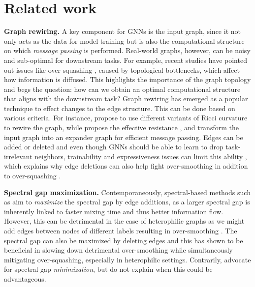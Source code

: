 \section{Related work}
\textbf{Graph rewiring.}
A key component for GNNs is the input graph, since it not only acts as the data for model training but is also the computational structure on which \emph{message passing} \citep{quachem} is performed. Real-world graphs, however, can be noisy and sub-optimal for downstream tasks. For example, recent studies have pointed out issues like over-squashing \citep{alon2021on,topping2022understanding,digiovanni2023oversquashing}, caused by topological bottlenecks, which affect how information is diffused. This highlights the importance of the graph topology and begs the question: how can we obtain an optimal computational structure that aligns with the downstream task? Graph rewiring has emerged as a popular technique to effect changes to the edge structure. This can be done based on various criteria. For instance, \citet{topping2022understanding,sjlr,borf} propose to use different variants of Ricci curvature \citep{hamilton} to rewire the graph, while \citet{effectiveresistance} propose the effective resistance \citep{chandraeffective}, and \citet{Banerjee,deac2022expander} transform the input graph into an expander graph \citep{salez2021sparse} for efficient message passing. 
Edges can be added or deleted and even though GNNs should be able to learn to drop task-irrelevant neighbors, trainability and expressiveness issues can limit this ability \citep{mustafa2023are,mustafa2024gate}, which explains why edge deletions can also help fight over-smoothing in addition to over-squashing \citep{jamadandi2024spectral}.

\textbf{Spectral gap maximization.}
Contemporaneously, spectral-based methods such as \citet{Fosr} aim to \textit{maximize} the spectral gap by edge additions, as a larger spectral gap is inherently linked to faster mixing time \citep{mixingtimes} and thus better information flow. However, this can be detrimental in the case of heterophilic graphs \citep{homonecessity,dichotomoy} as we might add edges between nodes of different labels resulting in over-smoothing \citep{li2019deepgcns,NT2019RevisitingGN,ono,zhou2021dirichlet,keriven2022not}. The spectral gap can also be maximized by deleting edges \citep{jamadandi2024spectral} and this has shown to be beneficial in slowing down detrimental over-smoothing while simultaneously mitigating over-squashing, especially in heterophilic settings. Contrarily, \citet{diffwire} advocate for spectral gap \textit{minimization}, but do not explain when this could be advantageous. 

